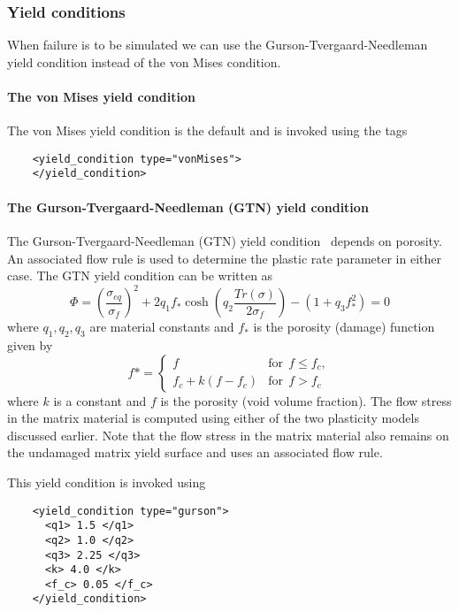   \subsubsection{Yield conditions}
  When failure is to be simulated we can use the Gurson-Tvergaard-Needleman
  yield condition instead of the von Mises condition.

  \paragraph{The von Mises yield condition}
  The von Mises yield condition is the default and is invoked using the tags
  \begin{verbatim}
    <yield_condition type="vonMises">
    </yield_condition>
  \end{verbatim}

  \paragraph{The Gurson-Tvergaard-Needleman (GTN) yield condition}
  The Gurson-Tvergaard-Needleman (GTN) yield 
  condition~\cite{Gurson77,Tver84} depends on porosity.  An associated 
  flow rule is used to determine the plastic rate parameter in either case.
  The GTN yield condition can be written as
  \begin{equation}
    \Phi = \left(\frac{\sigma_{eq}}{\sigma_f}\right)^2 +
    2 q_1 f_* \cosh \left(q_2 \frac{Tr(\sigma)}{2\sigma_f}\right) -
    (1+q_3 f_*^2) = 0
  \end{equation}
  where $q_1,q_2,q_3$ are material constants and $f_*$ is the porosity 
  (damage) function given by
  \begin{equation}
    f* = 
    \begin{cases}
      f & \text{for}~~ f \le f_c,\\ 
      f_c + k (f - f_c) & \text{for}~~ f > f_c 
    \end{cases}
  \end{equation}
  where $k$ is a constant and $f$ is the porosity (void volume fraction).  The 
  flow stress in the matrix material is computed using either of the two 
  plasticity models discussed earlier.  Note that the flow stress in the matrix 
  material also remains on the undamaged matrix yield surface and uses an 
  associated flow rule.

  This yield condition is invoked using
  \begin{verbatim}
    <yield_condition type="gurson">
      <q1> 1.5 </q1>
      <q2> 1.0 </q2>
      <q3> 2.25 </q3>
      <k> 4.0 </k>
      <f_c> 0.05 </f_c>
    </yield_condition>
  \end{verbatim}

